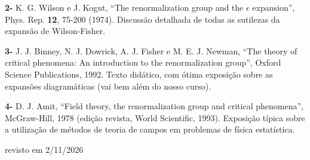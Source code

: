 \documentclass[12pt,a4paper]{article}
\begin{document}
\textbf{2-} K. G. Wilson e J. Kogut, ``The renormalization group and the $\epsilon$
expansion'', Phys. Rep. \textbf{12}, 75-200 (1974). Discussão detalhada de todas as
sutilezas da expansão de Wilson-Fisher.

\textbf{3-} J. J. Binney, N. J. Dowrick, A. J. Fisher e M. E. J. Newman, ``The
theory of critical phenomena: An introduction to the renormalization group'',
Oxford Science Publications, 1992. Texto didático, com ótima exposição
sobre as expansões diagramáticas (vai bem além do nosso curso).

\textbf{4-} D. J. Amit, ``Field theory, the renormalization group and critical
phenomena'', McGraw-Hill, 1978 (edição revista, World Scientific, 1993).
Exposição típica sobre a utilização de métodos de teoria de campos em
problemas de física estatística.

revisto em 2/11/2026
\end{document}
